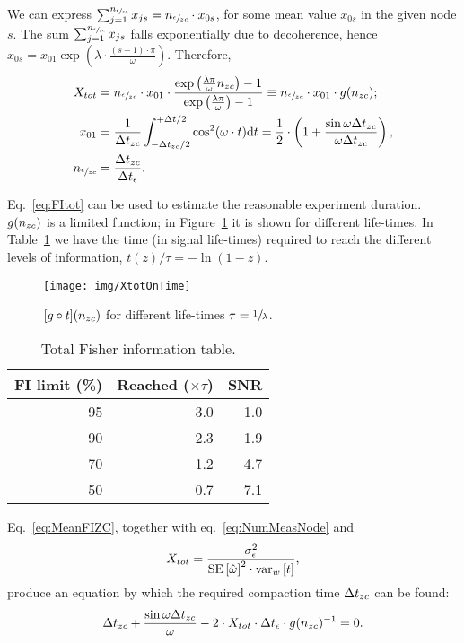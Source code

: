 \documentclass{article}
\newcommand{\dt}{\Delta t}
\newcommand{\dtm}{\dt_{\meas}}
\begin{document}
We can express $\sum_{j=1}^{n_{\sfrac{\epsilon}{zc}}} x_{js} = n_{\sfrac{\epsilon}{zc}} \cdot x_{0s}$, for some mean value $x_{0s}$ in the given node $s$. The sum $\sum_{j=1}^{n_{\sfrac{\epsilon}{zc}}} x_{js}$ falls exponentially due to decoherence, hence $x_{0s} = x_{01}\exp{(\lambda\cdot \frac{(s-1)\cdot\pi}{\omega})}$. Therefore,
\begin{align}
	X_{tot} & = \Nmnd\cdot x_{01} \cdot \frac{\exp{\bkt{\frac{\lambda\pi}{\omega}\Nnd}}-1}{\exp{\bkt{\frac{\lambda\pi}{\omega}}}-1} 
	\equiv \Nmnd \cdot x_{01}\cdot g(\Nnd); \label{eq:FItot}\\
	x_{01}  & = \frac{1}{\dtnd}\int_{-\dtnd/2}^{+\dt/2}\cos^2(\omega\cdot t)\td t = \frac12\cdot \bkt{1 + \frac{\sin\omega\dtnd}{\omega\dtnd}},                                    \label{eq:MeanFIZC}   \\
	\Nmnd   & = \frac{\dtnd}{\dtm}. \label{eq:NumMeasNode}
\end{align}

Eq.~\eqref{eq:FItot} can be used to estimate the reasonable experiment duration. $g(n_{zc})$ is a limited function; in Figure~\ref{fig:GofT} it is shown for different life-times. In Table~\ref{tbl:FItot} we have the time (in signal life-times) required to reach the different levels of information, $t(z)/\tau = -\ln(1-z)$. 
\begin{figure}[h]
	\centering
	\texttt{[image: img/XtotOnTime]}
	\caption{$[g\circ t](n_{zc})$ for different life-times $\tau = \sfrac1\lambda$.\label{fig:GofT}}
\end{figure}
\begin{table}[h]
	\centering
	\caption{Total Fisher information table.\label{tbl:FItot}}
	\begin{tabular}{rrr}
		\hline
		FI limit (\%) & Reached ($\times\tau$) & SNR \\ \hline
		           95 &                    3.0 & 1.0 \\
		           90 &                    2.3 & 1.9 \\
		           70 &                    1.2 & 4.7 \\
		           50 &                    0.7 & 7.1 \\ \hline
	\end{tabular}
\end{table}

Eq.~\eqref{eq:MeanFIZC}, together with eq.~\eqref{eq:NumMeasNode} and
\[
	\stat* = \stat,
\]
produce an equation by which the required compaction time $\dtnd$ can be found:
\begin{equation}\label{eq:CmpTEq}
	\dtnd + \frac{\sin\omega\dtnd}{\omega} - 2\cdot \stat* \cdot\dtm \cdot g(\Nnd)^{-1}= 0.
\end{equation}
\end{document}
